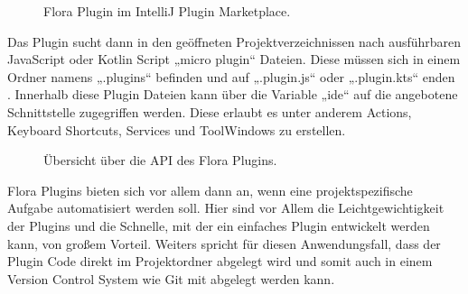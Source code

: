 \begin{figure}
    \centering
    \caption{Flora Plugin im IntelliJ Plugin Marketplace.}
    \label{fig:FloraPlugin}
\end{figure}    
 
Das Plugin sucht dann in den geöffneten Projektverzeichnissen
nach ausführbaren JavaScript oder Kotlin Script „micro plugin“ 
Dateien. Diese müssen sich in einem Ordner namens „.plugins“ 
befinden und auf „.plugin.js“ oder „.plugin.kts“ enden \cite{FloraPluginMarketplace}.
Innerhalb diese Plugin Dateien kann über die Variable „ide“ auf 
die angebotene Schnittstelle zugegriffen werden. Diese erlaubt 
es unter anderem Actions, Keyboard Shortcuts, Services und 
ToolWindows zu erstellen.

\begin{figure}
    \centering
    \caption{Übersicht über die API des Flora Plugins.}
    \label{fig:FloraPluginAPI}
\end{figure}    
 
Flora Plugins bieten sich vor allem dann an, wenn eine projektspezifische 
Aufgabe automatisiert werden soll. Hier sind vor Allem die 
Leichtgewichtigkeit der Plugins und die Schnelle, mit der ein 
einfaches Plugin entwickelt werden kann, von großem Vorteil. 
Weiters spricht für diesen Anwendungsfall, dass der Plugin Code 
direkt im Projektordner abgelegt wird und somit auch in einem Version 
Control System wie Git mit abgelegt werden kann.
